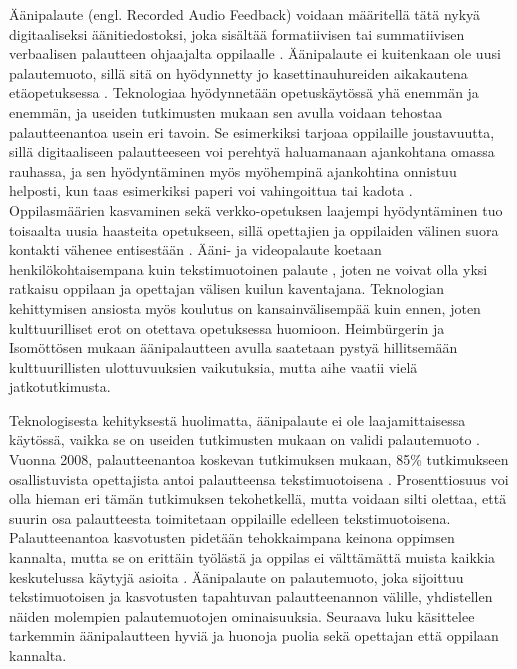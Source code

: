 \documentclass[utf8]{gradu3}
\begin{document}
Äänipalaute (engl. Recorded Audio Feedback) voidaan määritellä tätä nykyä digitaaliseksi äänitiedostoksi, joka sisältää formatiivisen tai summatiivisen verbaalisen palautteen ohjaajalta oppilaalle \parencite[][]{developing}. Äänipalaute ei kuitenkaan ole uusi palautemuoto, sillä sitä on hyödynnetty jo kasettinauhureiden aikakautena etäopetuksessa \parencite[][]{developing}. Teknologiaa hyödynnetään opetuskäytössä yhä enemmän ja enemmän, ja useiden tutkimusten mukaan sen avulla voidaan tehostaa palautteenantoa usein eri tavoin. Se esimerkiksi tarjoaa oppilaille joustavuutta, sillä digitaaliseen palautteeseen voi perehtyä haluamanaan ajankohtana omassa rauhassa, ja sen hyödyntäminen myös myöhempinä ajankohtina onnistuu helposti, kun taas esimerkiksi paperi voi vahingoittua tai kadota \parencite[][]{technology}. Oppilasmäärien kasvaminen sekä verkko-opetuksen laajempi hyödyntäminen tuo toisaalta uusia haasteita opetukseen, sillä opettajien ja oppilaiden välinen suora kontakti vähenee entisestään \parencite[][]{engaging}. Ääni- ja videopalaute koetaan henkilökohtaisempana kuin tekstimuotoinen palaute \parencite[][]{evaluating}, joten ne voivat olla yksi ratkaisu oppilaan ja opettajan välisen kuilun kaventajana. Teknologian kehittymisen ansiosta myös koulutus on kansainvälisempää kuin ennen, joten kulttuurilliset erot on otettava opetuksessa huomioon. Heimbürgerin ja Isomöttösen \parencite[][]{moderating} mukaan äänipalautteen avulla saatetaan pystyä hillitsemään kulttuurillisten ulottuvuuksien vaikutuksia, mutta aihe vaatii vielä jatkotutkimusta.

Teknologisesta kehityksestä huolimatta, äänipalaute  ei ole laajamittaisessa käytössä, vaikka se on useiden tutkimusten mukaan on validi palautemuoto \parencite[][]{engaging}. Vuonna 2008, palautteenantoa koskevan tutkimuksen mukaan, 85\% tutkimukseen osallistuvista opettajista antoi palautteensa tekstimuotoisena \parencite[][]{electronic}. Prosenttiosuus voi olla hieman eri tämän tutkimuksen tekohetkellä, mutta voidaan silti olettaa, että suurin osa palautteesta toimitetaan oppilaille edelleen tekstimuotoisena. Palautteenantoa kasvotusten pidetään tehokkaimpana keinona oppimsen kannalta, mutta se on erittäin työlästä ja oppilas ei välttämättä muista kaikkia keskutelussa käytyjä asioita \parencite[][]{modes}. Äänipalaute on palautemuoto, joka sijoittuu tekstimuotoisen ja kasvotusten tapahtuvan palautteenannon välille, yhdistellen näiden molempien palautemuotojen ominaisuuksia. Seuraava luku käsittelee tarkemmin äänipalautteen hyviä ja huonoja puolia sekä opettajan että oppilaan kannalta.
\end{document}
